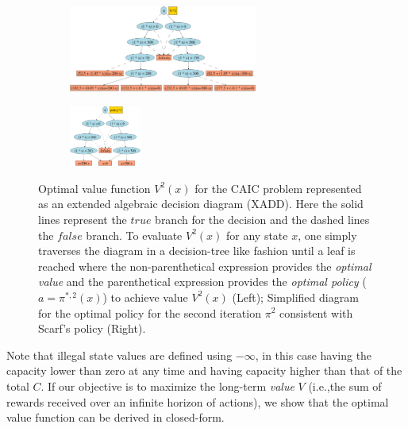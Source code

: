 \documentclass[twoside,11pt]{article}
\newcommand{\true}{\mathit{true}}
\newcommand{\false}{\mathit{false}}
\begin{document}
\begin{figure}[t!]
\centering
\begin{subfigure}
                \centering
                \includegraphics[width=0.68\textwidth]{Figures2/diagrams/inv-v2.pdf}
        \end{subfigure}
                \hspace{2mm}
\begin{subfigure}
                \centering
                \includegraphics[width=0.26\textwidth]{Figures2/diagrams/inv-p2.pdf}
        \end{subfigure}
\vspace{-2mm}
\caption{\footnotesize Optimal value function $V^2(x)$ for the
CAIC problem represented as an extended algebraic decision
diagram (XADD).  Here the solid lines represent the $\true$ branch for
the decision and the dashed lines the $\false$ branch.  To evaluate
$V^2(x)$ for any state $x$, one simply traverses the diagram in a
decision-tree like fashion until a leaf is reached where the
non-parenthetical expression provides the \emph{optimal value} and the
parenthetical expression provides the \emph{optimal policy} 
($a = \pi^{*,2}(x)$) to achieve value $V^2(x)$ (Left); Simplified diagram for the optimal policy for the second iteration $\pi^2$ consistent with Scarf's policy (Right).}
\label{fig:inv_policy}
\vspace{-6mm}
\end{figure}
Note that illegal state values are defined using $-\infty$, in this case having the capacity lower than zero at any time and having capacity higher than that of the total $C$. If our objective is to maximize the long-term \emph{value} $V$ (i.e.,the sum of rewards received over an infinite horizon of actions), we show that the optimal value function can be derived in closed-form. 
\end{document}

